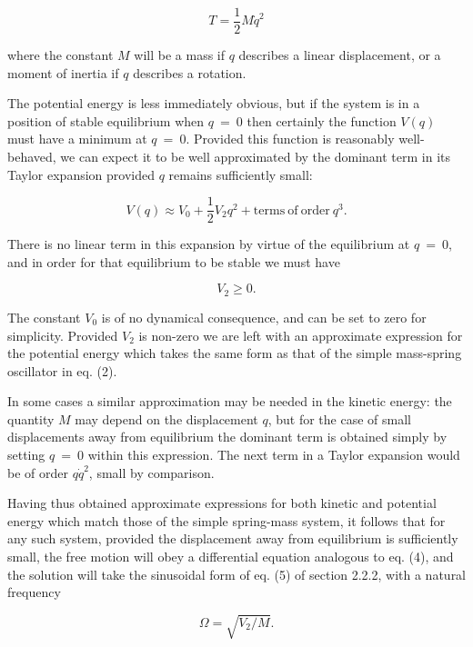   \begin{equation*}T=\frac{1}{2} M \dot{q}^2 \tag{5}\end{equation*} 

  \noindent{}where the constant $M$ will be a mass if $q$ describes a linear 
  displacement, or a moment of inertia if $q$ describes a rotation. 

  The potential energy is less immediately obvious, but if the system is in a 
  position of stable equilibrium when $q~=~0$ then certainly the function 
  $V(q)$ must have a minimum at $q~=~0$. Provided this function is reasonably 
  well-behaved, we can expect it to be well approximated by the dominant term 
  in its Taylor expansion provided $q$ remains sufficiently small: 

  \begin{equation*}V(q) \approx V_0+\frac{1}{2} V_2 q^2 + 
  \mathrm{terms~of~order~} q^3. \tag{6} \end{equation*} 

  There is no linear term in this expansion by virtue of the equilibrium at 
  $q~=~0$, and in order for that equilibrium to be stable we must have 

  \begin{equation*}V_2 \ge 0. \tag{7} \end{equation*} 

  The constant $V_0$ is of no dynamical consequence, and can be set to zero for 
  simplicity. Provided $V_2$ is non-zero we are left with an approximate 
  expression for the potential energy which takes the same form as that of the 
  simple mass-spring oscillator in eq. (2). 

  In some cases a similar approximation may be needed in the kinetic energy: 
  the quantity $M$ may depend on the displacement $q$, but for the case of 
  small displacements away from equilibrium the dominant term is obtained 
  simply by setting $q~=~0$ within this expression. The next term in a Taylor 
  expansion would be of order $q\dot{q}^2$, small by comparison. 

  Having thus obtained approximate expressions for both kinetic and potential 
  energy which match those of the simple spring-mass system, it follows that 
  for any such system, provided the displacement away from equilibrium is 
  sufficiently small, the free motion will obey a differential equation 
  analogous to eq. (4), and the solution will take the sinusoidal form of eq. 
  (5) of section 2.2.2, with a natural frequency 

  \begin{equation*}\Omega=\sqrt{V_2/M}. \tag{8} \end{equation*} 